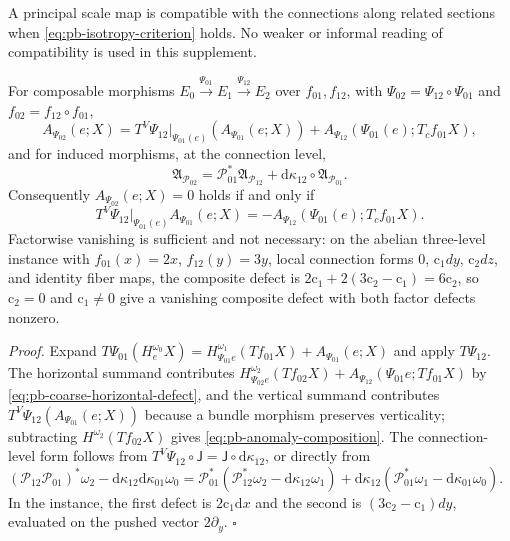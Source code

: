 A principal scale map is compatible with the connections along related sections when
\eqref{eq:pb-isotropy-criterion} holds. No weaker or informal reading of compatibility is used in this
supplement.

For composable morphisms \(E_0\xrightarrow{\Psi_{01}}E_1\xrightarrow{\Psi_{12}}E_2\) over
\(f_{01},f_{12}\), with \(\Psi_{02}=\Psi_{12}\circ\Psi_{01}\) and \(f_{02}=f_{12}\circ f_{01}\),
\begin{equation}
A_{\Psi_{02}}(e;X)
=T^V\Psi_{12}\big|_{\Psi_{01}(e)}
\left(A_{\Psi_{01}}(e;X)\right)
+A_{\Psi_{12}}\left(\Psi_{01}(e);T_cf_{01}X\right),
\label{eq:pb-anomaly-composition}
\end{equation}
and for induced morphisms, at the connection level,
\begin{equation}
\mathfrak A_{\mathcal P_{02}}
=\mathcal P_{01}^*\mathfrak A_{\mathcal P_{12}}
+\mathrm d\kappa_{12}\circ\mathfrak A_{\mathcal P_{01}}.
\label{eq:rg-scale-connection-defect-cocycle}
\end{equation}
Consequently \(A_{\Psi_{02}}(e;X)=0\) holds if and only if
\begin{equation}
T^V\Psi_{12}\big|_{\Psi_{01}(e)}A_{\Psi_{01}}(e;X)
=-A_{\Psi_{12}}\left(\Psi_{01}(e);T_cf_{01}X\right).
\label{eq:pb-anomaly-composition-vanishing}
\end{equation}
Factorwise vanishing is sufficient and not necessary: on the abelian three-level instance with
\(f_{01}(x)=2x\), \(f_{12}(y)=3y\), local connection forms \(0\), \(\mathrm c_1dy\), \(\mathrm c_2dz\), and
identity fiber maps, the composite defect is \(2\mathrm c_1+2(3\mathrm c_2-\mathrm c_1)=6\mathrm c_2\),
so \(\mathrm c_2=0\) and \(\mathrm c_1\ne0\) give a vanishing composite defect with both factor defects
nonzero. 

\noindent\emph{Proof.}
Expand \(T\Psi_{01}(H^{\omega_0}_eX)=H^{\omega_1}_{\Psi_{01}e}(Tf_{01}X)+A_{\Psi_{01}}(e;X)\) and apply
\(T\Psi_{12}\). The horizontal summand contributes
\(H^{\omega_2}_{\Psi_{02}e}(Tf_{02}X)+A_{\Psi_{12}}(\Psi_{01}e;Tf_{01}X)\) by
\eqref{eq:pb-coarse-horizontal-defect}, and the vertical summand contributes
\(T^V\Psi_{12}(A_{\Psi_{01}}(e;X))\) because a bundle morphism preserves verticality; subtracting
\(H^{\omega_2}(Tf_{02}X)\) gives \eqref{eq:pb-anomaly-composition}. The connection-level form follows
from \(T^V\Psi_{12}\circ\mathsf J=\mathsf J\circ\mathrm d\kappa_{12}\), or directly from
\((\mathcal P_{12}\mathcal P_{01})^*\omega_2-\mathrm d\kappa_{12}\mathrm d\kappa_{01}\omega_0
=\mathcal P_{01}^*(\mathcal P_{12}^*\omega_2-\mathrm d\kappa_{12}\omega_1)
+\mathrm d\kappa_{12}(\mathcal P_{01}^*\omega_1-\mathrm d\kappa_{01}\omega_0)\). In the instance, the
first defect is \(2\mathrm c_1\mathrm dx\) and the second is \((3\mathrm c_2-\mathrm c_1)dy\), evaluated on the
pushed vector \(2\partial_y\). \hfill$\square$

